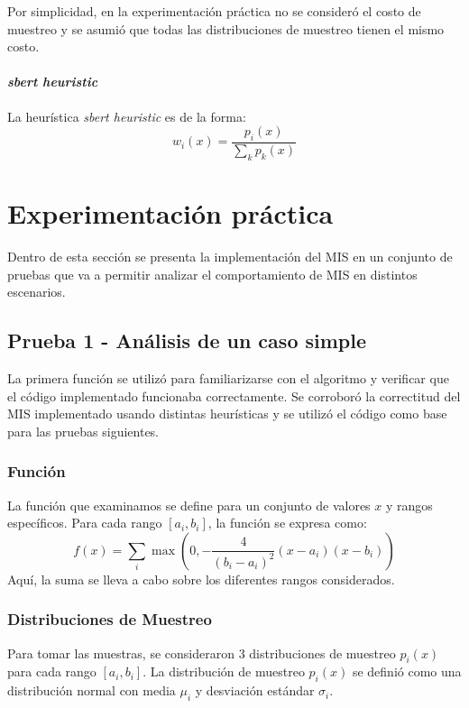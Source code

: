 \documentclass{article}
\begin{document}
Por simplicidad, en la experimentación práctica no se consideró el costo de muestreo y se asumió que todas las distribuciones de muestreo tienen el mismo costo.

\paragraph{\textit{sbert heuristic}} La heurística \textit{sbert heuristic} es de la forma:
$$ w_{i}(x) = \frac{p_{i}(x)}{\sum_{k} p_{k}(x)}$$

\section{Experimentación práctica}

Dentro de esta sección se presenta la implementación del MIS en un conjunto de pruebas que va a permitir analizar el comportamiento de MIS en distintos escenarios.

\subsection{Prueba 1 - Análisis de un caso simple}

La primera función se utilizó para familiarizarse con el algoritmo y verificar que el código implementado funcionaba correctamente.
Se corroboró la correctitud del MIS implementado usando distintas heurísticas y se utilizó el código como base para las pruebas siguientes.

\subsubsection{Función}
La función que examinamos se define para un conjunto de valores \( x \) y rangos específicos. Para cada rango \( [a_{i}, b_{i}] \), la función se expresa como:
$$
f(x) = \sum_{i} \max\left(0, -\frac{4}{(b_{i} - a_{i})^2} (x - a_{i})(x - b_{i})\right)
$$
Aquí, la suma se lleva a cabo sobre los diferentes rangos considerados.

\subsubsection{Distribuciones de Muestreo}

Para tomar las muestras, se consideraron 3 distribuciones de muestreo \( p_{i}(x) \) para cada rango \( [a_{i}, b_{i}] \).
La distribución de muestreo \( p_{i}(x) \) se definió como una distribución normal con media \( \mu_{i} \) y desviación estándar \( \sigma_{i} \).
\end{document}
